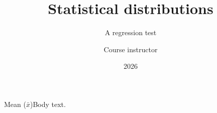 \documentclass[14pt,t]{beamer}
\title{Statistical distributions}
\subtitle{A regression test}
\author{Course instructor}
\date{2026}
\begin{document}
\begin{frame}\titlepage\end{frame}
\begin{frame}{Mean ($\bar{x}$)}Body text.\end{frame}
\end{document}
